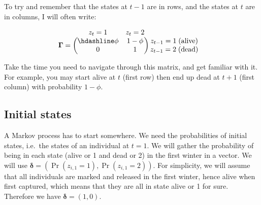 \documentclass[
  12pt,
]{krantz}
\begin{document}
To try and remember that the states at \(t-1\) are in rows, and the states at \(t\) are in columns, I will often write:

\[\begin{matrix}
& \\
\mathbf{\Gamma} =
    \left ( \vphantom{ \begin{matrix} 12 \\ 12 \end{matrix} } \right .
\end{matrix}
\hspace{-1.2em}
\begin{matrix}
    z_t=1 & z_t=2 \\ \hdashline
\phi & 1-\phi \\
0 & 1
\end{matrix}
\hspace{-0.2em}
\begin{matrix}
& \\
\left . \vphantom{ \begin{matrix} 12 \\ 12 \end{matrix} } \right )
    \begin{matrix}
    z_{t-1}=1 \; \mbox{(alive)} \\ z_{t-1}=2 \; \mbox{(dead)}
    \end{matrix}
\end{matrix}\]

Take the time you need to navigate through this matrix, and get familiar with it. For example, you may start alive at \(t\) (first row) then end up dead at \(t+1\) (first column) with probability \(1-\phi\).

\subsection{Initial states}\label{initial-states}

A Markov process has to start somewhere. We need the probabilities of initial states, i.e.~the states of an individual at \(t = 1\). We will gather the probability of being in each state (alive or 1 and dead or 2) in the first winter in a vector. We will use \(\mathbf{\delta} = \left(\Pr(z_{i,1} = 1), \Pr(z_{i,1} = 2)\right)\). For simplicity, we will assume that all individuals are marked and released in the first winter, hence alive when first captured, which means that they are all in state alive or 1 for sure. Therefore we have \(\mathbf{\delta} = \left(1, 0\right)\).
\end{document}
